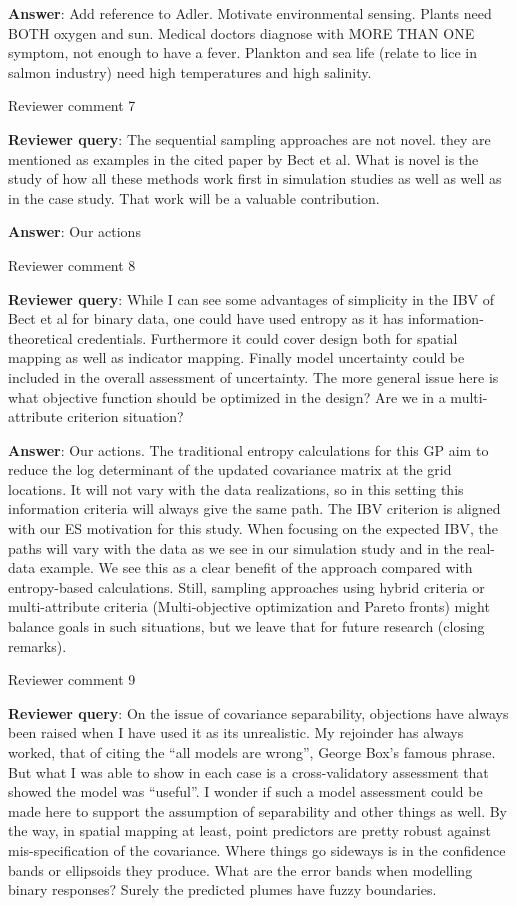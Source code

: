 \documentclass[a4paper]{article}
\def\reply{\textbf{Reviewer query}}
\def\action{\textbf{Answer}}
\begin{document}
\begin{answers}
\action: Add reference to Adler. Motivate environmental sensing. Plants need BOTH oxygen and sun. Medical doctors diagnose with MORE THAN ONE symptom, not enough to have a fever. Plankton and sea life (relate to lice in salmon industry) need high temperatures and high salinity. 

\item{Reviewer comment 7}\label{r1c7}

\reply: The sequential sampling approaches are not novel. they are mentioned as examples in the cited paper by Bect et al. What is novel is the study of how all these methods work first in simulation studies as well as well as in the case study. That work will be a valuable contribution.

\action: Our actions

\item{Reviewer comment 8}\label{r1c8}

\reply: While I can see some advantages of simplicity in the IBV of Bect et al for binary data, one could have used entropy as it has information-theoretical credentials. Furthermore it could cover design both for spatial mapping as well as indicator mapping. Finally model uncertainty could be included in the overall assessment of uncertainty. The more general issue here is what objective function should be optimized in the design? Are we in a multi-attribute criterion situation?

\action: Our actions. The traditional entropy calculations for this GP aim to reduce the log determinant of the updated covariance matrix at the grid locations. It will not vary with the data realizations, so in this setting this information criteria will always give the same path. The IBV criterion is aligned with our ES motivation for this study. When focusing on the expected IBV, the paths will vary with the data as we see in our simulation study and in the real-data example. We see this as a clear benefit of the approach compared with entropy-based calculations. Still, sampling approaches using hybrid criteria or multi-attribute criteria (Multi-objective optimization and Pareto fronts) might balance goals in such situations, but we leave that for future research (closing remarks). 

\item{Reviewer comment 9}\label{r1c9}

\reply: On the issue of covariance separability, objections have always been raised when I have used it as its unrealistic. My rejoinder has always worked, that of citing the “all models are wrong”, George Box’s famous phrase. But what I was able to show in each case is a cross-validatory assessment that showed the model was “useful”. I wonder if such a model assessment could be made here to support the assumption of separability and other things as well. By the way, in spatial mapping at least, point predictors are pretty robust against mis-specification of the covariance. Where things go sideways is in the confidence bands or ellipsoids they produce. What are the error bands when modelling binary responses? Surely the predicted plumes have fuzzy boundaries. 


\end{answers}
\end{document}
